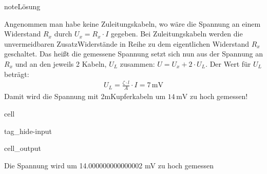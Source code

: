 \documentclass[letterpaper,10pt,english]{jupyterBook}
\begin{document}
\begin{sphinxadmonition}{note}{Lösung}

\sphinxAtStartPar
Angenommen man habe keine Zuleitungskabeln, wo wäre die Spannung an einem Widerstand \(R_x\) durch \(U_x = R_x \cdot I\) gegeben.
Bei Zuleitungskabeln werden die unvermeidbaren Zusatz\sphinxhyphen{}Widerstände in Reihe zu dem eigentlichen Widerstand \(R_x\) geschaltet. Das heißt die gemessene Spannung setzt sich nun aus der Spannung an \(R_x\) und an den jeweils 2 Kabeln, \(U_L\) zusammen: \(U = U_x + 2\cdot U_L\).
Der Wert für \(U_L\) beträgt:
\begin{equation*}
\begin{split}U_L = \frac{\zeta \cdot l}{A} \cdot I = 7\,\mathrm{mV}\end{split}
\end{equation*}
\sphinxAtStartPar
Damit wird die Spannung mit 2m\sphinxhyphen{}Kupferkabeln um \(14\,\mathrm{mV}\) zu hoch gemessen!
\end{sphinxadmonition}

\begin{sphinxuseclass}{cell}
\begin{sphinxuseclass}{tag_hide-input}\begin{sphinxVerbatimOutput}

\begin{sphinxuseclass}{cell_output}
\begin{sphinxVerbatim}[commandchars=\\\{\}]
Die Spannung wird um  14.000000000000002 mV zu hoch gemessen
\end{sphinxVerbatim}

\end{sphinxuseclass}\end{sphinxVerbatimOutput}

\end{sphinxuseclass}
\end{sphinxuseclass}
\end{document}
